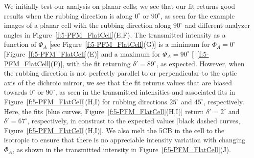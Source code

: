 We initially test our analysis on planar cells; we see that our fit returns good results when the rubbing direction is along $0^{\circ}$ or $90^{\circ}$, as seen for the example images of a planar cell with the rubbing direction along $90^{\circ}$ and different analyzer angles in Figure~\ref{f:5-PFM_FlatCell}(E,F).
The transmitted intensity as a function of $\Phi_A$ [see Figure~\ref{f:5-PFM_FlatCell}(G)] is a minimum for $\Phi_A = 0^{\circ}$ [Figure~\ref{f:5-PFM_FlatCell}(E)] and a maximum for $\Phi_A = 90^{\circ}$ [~\ref{f:5-PFM_FlatCell}(F)], with the fit returning $\delta' = 89^{\circ}$, as expected.
However, when the rubbing direction is not perfectly parallel to or perpendicular to the optic axis of the dichroic mirror, we see that the fit returns values that are biased towards $0^{\circ}$ or $90^{\circ}$, as seen in the transmitted intensities and associated fits in Figure~\ref{f:5-PFM_FlatCell}(H,I) for rubbing directions $25^{\circ}$ and $45^{\circ}$, respectively.
Here, the fits [blue curves, Figure~\ref{f:5-PFM_FlatCell}(H,I)] return $\delta' = 2^{\circ}$ and $\delta' = 67^{\circ}$, respectively, in constrast to the expected values [black dashed curves, Figure~\ref{f:5-PFM_FlatCell}(H,I)].
We also melt the 5CB in the cell to the isotropic to ensure that there is no appreciable intensity variation with changing $\Phi_A$, as shown in the transmitted intensity in Figure~\ref{f:5-PFM_FlatCell}(J).


